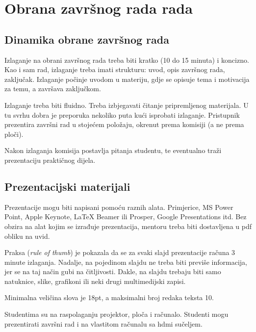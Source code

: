 \section{Obrana završnog rada rada}
\subsection{Dinamika obrane završnog rada}
Izlaganje na obrani završnog rada treba biti kratko (10 do 15 minuta) i koncizno. Kao i sam rad, izlaganje treba imati strukturu: 
uvod, opis završnog rada, zaključak. Izlaganje počinje uvodom u materiju, gdje se opisuje tema i motivacija za temu, a završava zaključkom.

Izlaganje treba biti fluidno. Treba izbjegavati čitanje pripremljenog materijala. U tu svrhu dobra je preporuka nekoliko puta kući isprobati izlaganje. Pristupnik prezentira završni rad u stojećem položaju, okrenut prema komisiji (a ne prema ploči).

Nakon izlaganja komisija postavlja pitanja studentu, te eventualno traži prezentaciju praktičnog dijela. 

\subsection{Prezentacijski materijali}
Prezentacije mogu biti napisani pomoću raznih alata. Primjerice, MS Power Point, Apple Keynote, LaTeX Beamer ili Prosper, 
Google Presentations itd. Bez obzira na alat kojim se izrađuje 
prezentacija, mentoru treba biti dostavljena u pdf obliku na uvid. 

Praksa (\textit{rule of thumb}) je pokazala da se za svaki slajd prezentacije računa 3 minute izlaganja. 
Nadalje, na pojedinom slajdu ne treba biti previše informacija, jer se na taj način gubi na 
čitljivosti. Dakle, na slajdu trebaju biti samo natuknice, slike, grafikoni ili neki drugi multimedijski zapisi. 

Minimalna veličina slova je 18pt, a maksimalni broj redaka teksta 10.

Studentima su na raspolaganju projektor, ploča i računalo. Studenti mogu prezentirati završni rad i na vlastitom računalu sa hdmi sučeljem.
